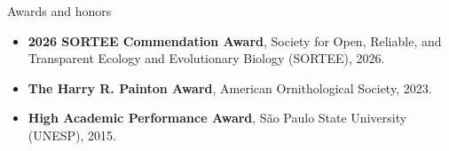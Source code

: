 \documentclass{resume}
\begin{document}
\begin{rSection}{Awards and honors}
\begin{itemize}
\item \textbf{2026 SORTEE Commendation Award}, Society for Open, Reliable, and Transparent Ecology and Evolutionary Biology (SORTEE), 2026.
\item \textbf{The Harry R. Painton Award}, American Ornithological Society, 2023.
\item \textbf{High Academic Performance Award}, São Paulo State University (UNESP), 2015.
\end{itemize}
\end{rSection}
\end{document}
